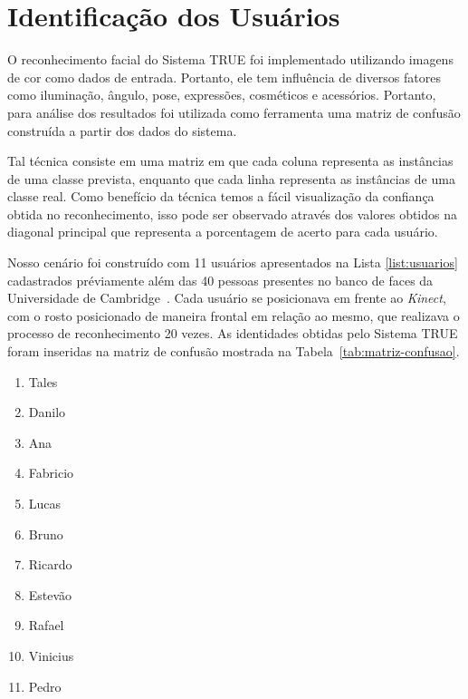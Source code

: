 \section{Identificação dos Usuários}
	 
	O reconhecimento facial do Sistema TRUE foi implementado utilizando imagens de cor como dados de entrada. Portanto, ele tem influência de diversos fatores como iluminação, ângulo, pose, expressões, cosméticos e acessórios. Portanto, para análise dos resultados foi utilizada como ferramenta uma matriz de confusão construída a partir dos dados do sistema.

	Tal técnica consiste em uma matriz em que cada coluna representa as instâncias de uma classe prevista, enquanto que cada linha representa as instâncias de uma classe real. Como benefício da técnica temos a fácil visualização da confiança obtida no reconhecimento, isso pode ser observado através dos valores obtidos na diagonal principal que representa a porcentagem de acerto para cada usuário.

	Nosso cenário foi construído com 11 usuários apresentados na Lista
	\ref{list:usuarios} cadastrados préviamente além das 40 pessoas presentes no banco de faces da
	Universidade de Cambridge~\cite{cambridgeFaceDb}. Cada usuário se posicionava
	em frente ao \textit{Kinect}, com o rosto posicionado de maneira frontal em
	relação ao mesmo, que realizava o processo de reconhecimento 20 vezes. As
	identidades obtidas pelo Sistema TRUE foram inseridas na matriz de confusão
	mostrada na Tabela~\ref{tab:matriz-confusao}.
	
	\begin{enumerate}
	  \bf \item Tales \label{user:tales}
	  \bf \item Danilo \label{user:danilo}
	  \bf \item Ana \label{user:ana}
	  \bf \item Fabricio \label{user:fabricio}
	  \bf \item Lucas \label{user:lucas}
	  \bf \item Bruno \label{user:bruno}
	  \bf \item Ricardo \label{user:ricardo}
	  \bf \item Estevão \label{user:estevao}
	  \bf \item Rafael \label{user:rafael}
	  \bf \item Vinicius \label{user:vinicius}
	  \bf \item Pedro \label{user:pedro}
	  \label{list:usuarios}
	\end{enumerate}
	
